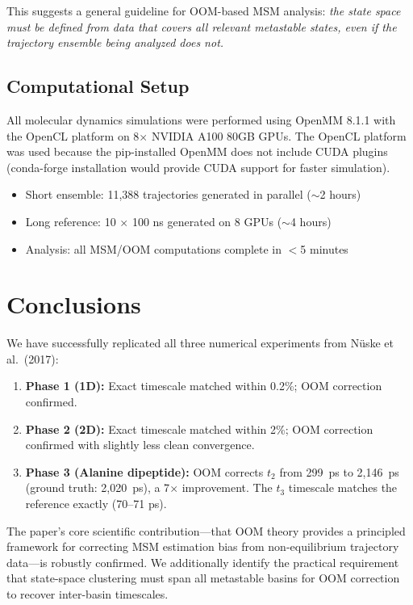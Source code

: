 \documentclass[11pt,a4paper]{article}
\begin{document}
This suggests a general guideline for OOM-based MSM analysis: \textit{the state space must be defined from data that covers all relevant metastable states, even if the trajectory ensemble being analyzed does not.}

\subsection{Computational Setup}

All molecular dynamics simulations were performed using OpenMM 8.1.1 with the OpenCL platform on 8$\times$ NVIDIA A100 80GB GPUs. The OpenCL platform was used because the pip-installed OpenMM does not include CUDA plugins (conda-forge installation would provide CUDA support for faster simulation).

\begin{itemize}[nosep]
    \item Short ensemble: 11{,}388 trajectories generated in parallel ($\sim$2 hours)
    \item Long reference: 10 $\times$ 100 ns generated on 8 GPUs ($\sim$4 hours)
    \item Analysis: all MSM/OOM computations complete in $<$5 minutes
\end{itemize}

\section{Conclusions}

We have successfully replicated all three numerical experiments from N\"uske et al.\ (2017):

\begin{enumerate}
    \item \textbf{Phase 1 (1D):} Exact timescale matched within 0.2\%; OOM correction confirmed.
    \item \textbf{Phase 2 (2D):} Exact timescale matched within 2\%; OOM correction confirmed with slightly less clean convergence.
    \item \textbf{Phase 3 (Alanine dipeptide):} OOM corrects $t_2$ from 299~ps to 2{,}146~ps (ground truth: 2{,}020~ps), a 7$\times$ improvement. The $t_3$ timescale matches the reference exactly (70--71 ps).
\end{enumerate}

The paper's core scientific contribution---that OOM theory provides a principled framework for correcting MSM estimation bias from non-equilibrium trajectory data---is robustly confirmed. We additionally identify the practical requirement that state-space clustering must span all metastable basins for OOM correction to recover inter-basin timescales.
\end{document}
